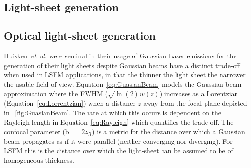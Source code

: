 


%

\subsection{Light-sheet generation}
\subsection{Optical \gls{light-sheet} generation}


Huisken~\emph{et~al.} were seminal in their usage of Gaussian \gls{Laser} emissions for the generation of their light sheets despite \gls{Gaussian beam}s have a distinct trade-off when used in LSFM applications, in that the thinner the light sheet the narrower the usable field of view.
Equation~\eqref{eq:GuasianBeam} models the Gaussian beam approximation where the \gls{FWHM} ($\sqrt{\ln(2)}w(z)$) %
increases as a \gls{Lorentzian} (Equation~\eqref{eq:Lorrentzian}) when a distance $z$ away from the focal plane depicted in \figurename~\ref{fig:GuasianBeam}.
The rate at which this occurs is dependent on the \gls{Rayleigh length} in Equation~\eqref{eq:Rayleigh} which quantifies the trade-off.
The confocal parameter (\gls{b}~$=2z_R$) is a metric for the distance over which a Gaussian beam propagates as if it were parallel (neither converging nor diverging).
For \gls{LSFM} this is the distance over which the \gls{light-sheet} can be assumed to be of homogeneous thickness.

